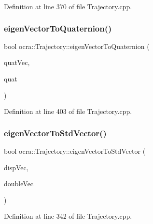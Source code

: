 Definition at line 370 of file Trajectory.\+cpp.

\hypertarget{classocra_1_1Trajectory_a943c143409f5f8c49ec4878e5d7b838b}{}\label{classocra_1_1Trajectory_a943c143409f5f8c49ec4878e5d7b838b} 
\subsubsection{\texorpdfstring{eigen\+Vector\+To\+Quaternion()}{eigenVectorToQuaternion()}}
{\footnotesize\ttfamily bool ocra\+::\+Trajectory\+::eigen\+Vector\+To\+Quaternion (\begin{DoxyParamCaption}\item[{const Eigen\+::\+Vector\+Xd \&}]{quat\+Vec,  }\item[{Eigen\+::\+Rotation3d \&}]{quat }\end{DoxyParamCaption})}



Definition at line 403 of file Trajectory.\+cpp.

\hypertarget{classocra_1_1Trajectory_a64c08a544337e1a1a50f2bbdd73f2005}{}\label{classocra_1_1Trajectory_a64c08a544337e1a1a50f2bbdd73f2005} 
\subsubsection{\texorpdfstring{eigen\+Vector\+To\+Std\+Vector()}{eigenVectorToStdVector()}}
{\footnotesize\ttfamily bool ocra\+::\+Trajectory\+::eigen\+Vector\+To\+Std\+Vector (\begin{DoxyParamCaption}\item[{const Eigen\+::\+Vector\+Xd \&}]{disp\+Vec,  }\item[{std\+::vector$<$ double $>$ \&}]{double\+Vec }\end{DoxyParamCaption})}



Definition at line 342 of file Trajectory.\+cpp.

\hypertarget{classocra_1_1Trajectory_a74c6fb6857f2f7fe24dcb666acff8571}{}\label{classocra_1_1Trajectory_a74c6fb6857f2f7fe24dcb666acff8571} 
